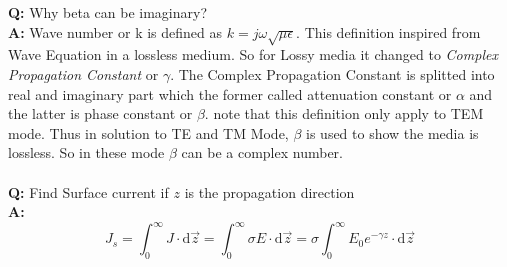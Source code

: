 \textbf{Q:} Why beta can be imaginary?\\
\textbf{A:} Wave number or k is defined as $ k = j \omega \sqrt{\mu \epsilon} $. This definition inspired from Wave Equation in a lossless medium. So for Lossy media it changed to {\it Complex Propagation Constant} or $\gamma$.  The Complex Propagation Constant is splitted into real and imaginary part which the former called attenuation constant or $\alpha$ and the latter is phase constant or $\beta$. note that this definition only apply to TEM mode. Thus in solution to TE and TM Mode, $\beta$ is used to show the media is lossless. So in these mode $\beta$ can be a complex number.
\\\\\textbf{Q:} Find Surface current if $z$ is the propagation direction\\
\textbf{A:} 
$$ J_s =  \int_{0}^{\infty}{ J } \cdot \mathrm{d}\vec{z} = \int_{0}^{\infty}{\sigma E} \cdot \mathrm{d}\vec{z} = \sigma \int_{0}^{\infty}{E_0 e^{-\gamma z}} \cdot \mathrm{d}\vec{z} $$
